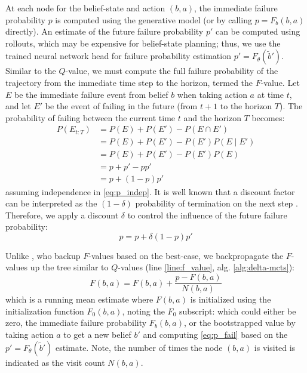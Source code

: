 At each node for the belief-state and action $(b,a)$, the immediate failure probability $p$ is computed using the generative model (or by calling $p = F_b(b,a)$ directly). 
An estimate of the future failure probability $p'$ can be computed using rollouts, which may be expensive for belief-state planning; thus, we use the trained neural network head for failure probability estimation $p' = F_\theta(\tilde{b}')$.
Similar to the $Q$-value, we must compute the full failure probability of the trajectory from the immediate time step to the horizon, termed the $F$-value.
Let $E$ be the immediate failure event from belief $b$ when taking action $a$ at time $t$, and let $E'$ be the event of failing in the future (from $t+1$ to the horizon $T$).
The probability of failing between the current time $t$ and the horizon $T$ becomes:
\begin{align}
    P(E_{t:T}) &= P(E) + P(E') - P(E \cap E')\\
               &= P(E) + P(E') - P(E')P(E \mid E')\\
               &= P(E) + P(E') - P(E')P(E) \label{eq:p_indep}\\
               &= p + p' - pp'\\
               &= p + (1-p)p'
\end{align}
assuming independence in \cref{eq:p_indep}.
It is well known that a discount factor can be interpreted as the $(1 - \delta)$ probability of termination on the next step \cite{littman1994markov,sutton2018reinforcement}.
Therefore, we apply a discount $\delta$ to control the influence of the future failure probability:
\begin{equation}
    p = p + \delta(1-p)p' \label{eq:p_fail}
\end{equation}

Unlike \textcite{carpin2022solving}, who backup $F$-values based on the best-case, we backpropagate the $F$-values up the tree similar to $Q$-values (line \ref*{line:f_value}, alg. \ref{alg:delta-mcts}):
\begin{equation}
    F(b,a) = F(b,a) + \frac{p - F(b,a)}{N(b,a)} \label{eq:f_value}
\end{equation}
which is a running mean estimate where $F(b,a)$ is initialized using the initialization function $F_0(b,a)$, noting the $F_0$ subscript: which could either be zero, the immediate failure probability $F_b(b,a)$, or the bootstrapped value by taking action $a$ to get a new belief $b'$ and computing \cref{eq:p_fail} based on the $p' = F_\theta(\tilde{b}')$ estimate.
Note, the number of times the node $(b,a)$ is visited is indicated as the visit count $N(b,a)$.

